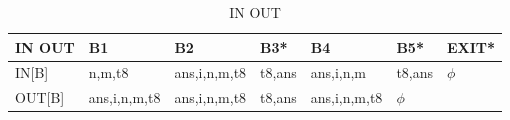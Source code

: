 \documentclass[UTF8]{ctexart} %
\begin{document}
\begin{table}[H]
    \centering
    \begin{tabular}{|p{1.5cm}<{\centering}|p{2cm}<{\centering}|p{2cm}<{\centering}|p{1cm}<{\centering}|p{2cm}<{\centering}|p{1.2cm}<{\centering}|p{1.1cm}<{\centering}|}
        \hline
        IN OUT & B1           & B2           & B3*    & B4           & B5*    & EXIT*  \\
        \hline
        IN[B]  & n,m,t8       & ans,i,n,m,t8 & t8,ans & ans,i,n,m    & t8,ans & $\phi$ \\
        \hline
        OUT[B] & ans,i,n,m,t8 & ans,i,n,m,t8 & t8,ans & ans,i,n,m,t8 & $\phi$ &        \\
        \hline
    \end{tabular}
    \caption{IN OUT}
\end{table}
\end{document}
